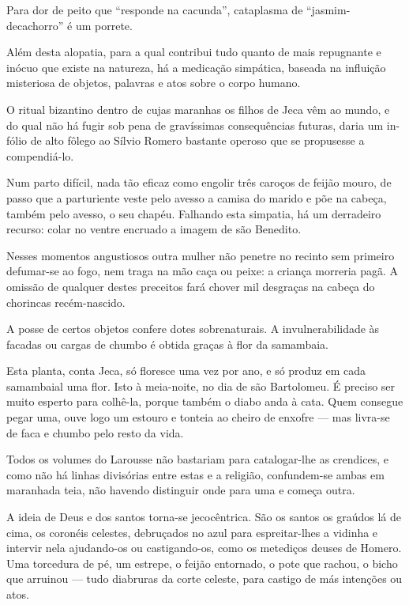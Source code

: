 Para dor de peito que ``responde na cacunda'', cataplasma de
``jasmim-decachorro'' é um porrete.

Além desta alopatia, para a qual contribui tudo quanto de mais
repugnante e inócuo que existe na natureza, há a medicação simpática,
baseada na influição misteriosa de objetos, palavras e atos sobre o
corpo humano.

O ritual bizantino dentro de cujas maranhas os filhos de Jeca vêm ao
mundo, e do qual não há fugir sob pena de gravíssimas consequências
futuras, daria um in-fólio de alto fôlego ao Sílvio Romero bastante
operoso que se propusesse a compendiá-lo.

Num parto difícil, nada tão eficaz como engolir três caroços de feijão
mouro, de passo que a parturiente veste pelo avesso a camisa do marido e
põe na cabeça, também pelo avesso, o seu chapéu. Falhando esta simpatia,
há um derradeiro recurso: colar no ventre encruado a imagem de são
Benedito.

Nesses momentos angustiosos outra mulher não penetre no recinto sem
primeiro defumar-se ao fogo, nem traga na mão caça ou peixe: a criança
morreria pagã. A omissão de qualquer destes preceitos fará chover mil
desgraças na cabeça do chorincas recém-nascido.

A posse de certos objetos confere dotes sobrenaturais. A
invulnerabilidade às facadas ou cargas de chumbo é obtida graças à flor
da samambaia.

Esta planta, conta Jeca, só floresce uma vez por ano, e só produz em
cada samambaial uma flor. Isto à meia-noite, no dia de são Bartolomeu. É
preciso ser muito esperto para colhê-la, porque também o diabo anda à
cata. Quem consegue pegar uma, ouve logo um estouro e tonteia ao cheiro
de enxofre --- mas livra-se de faca e chumbo pelo resto da vida.

Todos os volumes do Larousse não bastariam para catalogar-lhe as
crendices, e como não há linhas divisórias entre estas e a religião,
confundem-se ambas em maranhada teia, não havendo distinguir onde para
uma e começa outra.

A ideia de Deus e dos santos torna-se jecocêntrica. São os santos os
graúdos lá de cima, os coronéis celestes, debruçados no azul para
espreitar-lhes a vidinha e intervir nela ajudando-os ou castigando-os,
como os metediços deuses de Homero. Uma torcedura de pé, um estrepe, o
feijão entornado, o pote que rachou, o bicho que arruinou --- tudo
diabruras da corte celeste, para castigo de más intenções ou atos.

